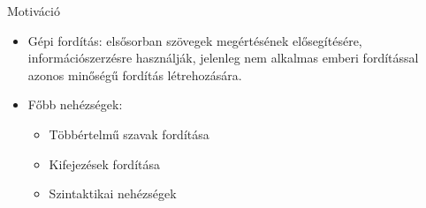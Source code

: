 \begin{frame}{Motiváció}
\begin{itemize}
  \item {Gépi fordítás: elsősorban szövegek megértésének elősegítésére, információszerzésre használják, jelenleg nem alkalmas emberi fordítással azonos minőségű fordítás létrehozására.}
  \item {Főbb nehézségek:}
  \begin{itemize}
  \item {Többértelmű szavak fordítása}
  \item {Kifejezések fordítása}
  \item {Szintaktikai nehézségek}
  \end{itemize}
  
\end{itemize}

\end{frame}